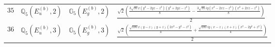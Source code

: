 \documentclass[fleqn,8pt,landscape]{jsarticle}
\begin{document}
\begin{table}[ht!]
\begin{center}
\begin{tabular}{cccl}
$ 35 $ & $ \mathbb{Q}_{5}(E_{u}^{(b)},2) $ & $ \mathbb{G}_{5}(E_{g}^{(b)},2) $ & $ \frac{\sqrt{2} \left(\frac{3 \sqrt{35} x \left(y^{2} - 2 y z - z^{2}\right) \left(y^{2} + 2 y z - z^{2}\right)}{8} - \frac{3 \sqrt{35} i y \left(x^{2} - 2 x z - z^{2}\right) \left(x^{2} + 2 x z - z^{2}\right)}{8}\right)}{2} $ \\
$ 36 $ & $ \mathbb{Q}_{5}(E_{u}^{(b)},3) $ & $ \mathbb{G}_{5}(E_{g}^{(b)},3) $ & $ \frac{\sqrt{2} \left(\frac{\sqrt{105} x \left(y - z\right) \left(y + z\right) \left(2 x^{2} - y^{2} - z^{2}\right)}{4} + \frac{\sqrt{105} i y \left(x - z\right) \left(x + z\right) \left(x^{2} - 2 y^{2} + z^{2}\right)}{4}\right)}{2} $ \\
 \hline \hline
\end{tabular}
\end{center}
\end{table}
\end{document}
